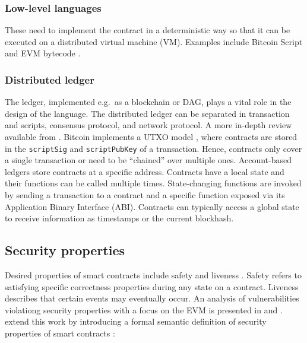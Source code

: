 \subsubsection{Low-level languages} These need to implement the contract in a deterministic way so that it can be executed on a distributed virtual machine (VM). Examples include Bitcoin Script \cite{BitcoinWiki2018Script} and EVM bytecode \cite{Wood2014}.

\subsubsection{Distributed ledger} The ledger, implemented e.g.\ as a blockchain or DAG, plays a vital role in the design of the language. 
The distributed ledger can be separated in transaction and scripts, consensus protocol, and network protocol. 
A more in-depth review available from \cite{Bonneau2015}.
Bitcoin implements a UTXO model \cite{Nakamoto2008,Covaci2018}, where contracts are stored in the \texttt{scriptSig} and \texttt{scriptPubKey} of a transaction. 
Hence, contracts only cover a single transaction or need to be ``chained'' over multiple ones.
Account-based ledgers store contracts at a specific address.
Contracts have a local state and their functions can be called multiple times.
State-changing functions are invoked by sending a transaction to a contract and a specific function exposed via its Application Binary Interface (ABI).
Contracts can typically access a global state to receive information as timestamps or the current blockhash. 



\subsection{Security properties}
Desired properties of smart contracts include safety and liveness \cite{Sergey2018}.
Safety refers to satisfying specific correctness properties during any state on a contract.
Liveness describes that certain events may eventually occur.
An analysis of vulnerabilities violationg security properties with a focus on the EVM is presented in \cite{Luu2016} and \cite{Atzei2017}.
\citeauthor{Grishchenko2018} extend this work by introducing a formal semantic definition of security properties of smart contracts \cite{Grishchenko2018}:

